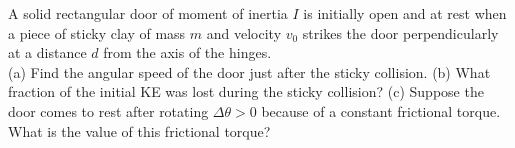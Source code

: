 A solid rectangular door of moment of inertia $I$ is initially open
and at rest when a piece of sticky clay of mass $m$ and velocity
$v_0$ strikes the door perpendicularly at a distance $d$ from the axis of the hinges.\\
%
(a) Find the angular speed of the door just after the sticky
collision.\answercheck\hwendpart
%
(b) What fraction of the initial KE was lost during the sticky
collision?\answercheck\hwendpart
%
(c) Suppose the door comes to rest after rotating $\Delta\theta > 0$
because of a constant frictional torque. What is the value of this
frictional torque?\answercheck
